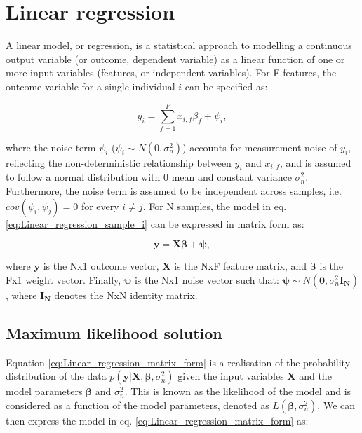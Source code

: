 
\section{Linear regression} 
\label{sec:linear_regression}

A linear model, or regression, is a statistical approach to modelling a continuous output variable (or outcome, dependent variable) as a linear function of one or more input variables (features, or independent variables). 
For F features, the outcome variable for a single individual $i$ can be specified as:

\begin{equation} \label{eq:Linear_regression_sample_i}
 y_i = \sum_{f=1}^{F} x_{i,f}\beta_f + \psi_i,
\end{equation}

where the noise term $\psi_i$ ($ \psi_i \sim N(0, \sigma_n^2)$) accounts for measurement noise of $y_i$, reflecting the non-deterministic relationship between $y_i$ and $x_{i,f}$, and is assumed to follow a normal distribution with 0 mean and constant variance $\sigma_n^2$. 
Furthermore, the noise term is assumed to be independent across samples, i.e. $cov(\psi_i, \psi_j)=0$ for every $i \neq j$. 
For N samples, the model in eq. \eqref{eq:Linear_regression_sample_i} can be expressed in matrix form as:

\begin{equation} \label{eq:Linear_regression_matrix_form}
\mathbf{y} = \mathbf{X}\boldsymbol{\beta} + \boldsymbol{\psi}, 
\end{equation}

where $\mathbf{y}$ is the Nx1 outcome vector, $\mathbf{X}$ is the NxF feature matrix, and $\boldsymbol{\beta}$ is the Fx1 weight vector. 
Finally, $\boldsymbol{\psi}$ is the Nx1 noise vector such that: $\boldsymbol{\psi}\sim N(\mathbf{0}, \sigma_n^2 \mathbf{I_N})$, where $\mathbf{I_N}$ denotes the NxN identity matrix. \\ 


\subsection{Maximum likelihood solution}

Equation \eqref{eq:Linear_regression_matrix_form} is a realisation of the probability distribution of the data $p(\mathbf{y}| \mathbf{X}, \boldsymbol{\beta}, \sigma_n^2)$ given the input variables $\mathbf{X}$ and the model parameters $\boldsymbol{\beta}$ and $\sigma_n^2$.
This is known as the likelihood of the model and is considered as a function of the model parameters, denoted as $L(\boldsymbol{\beta}, \sigma_n^2)$. 
We can then express the model in eq. \eqref{eq:Linear_regression_matrix_form} as:

